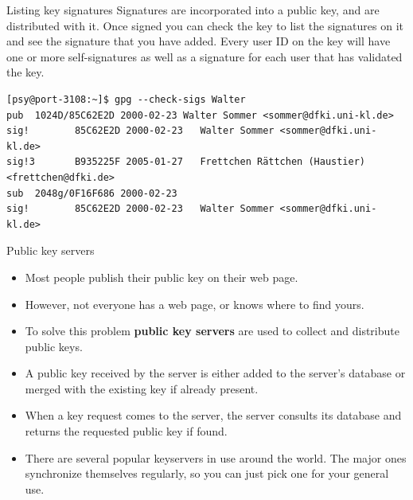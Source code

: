 \documentclass[%
mode=present,%
paper=smartboard,
size=20pt,
]{powerdot}
\begin{document}
\begin{slide}[method=direct]{Listing key signatures}
  Signatures are incorporated into a public key, and are distributed
  with it.  Once signed you can check the key to list the signatures
  on it and see the signature that you have added. Every user ID on
  the key will have one or more self-signatures as well as a signature
  for each user that has validated the key.\\[1ex]

\begin{verbatim}
[psy@port-3108:~]$ gpg --check-sigs Walter
pub  1024D/85C62E2D 2000-02-23 Walter Sommer <sommer@dfki.uni-kl.de>
sig!        85C62E2D 2000-02-23   Walter Sommer <sommer@dfki.uni-kl.de>
sig!3       B935225F 2005-01-27   Frettchen Rättchen (Haustier) <frettchen@dfki.de>
sub  2048g/0F16F686 2000-02-23
sig!        85C62E2D 2000-02-23   Walter Sommer <sommer@dfki.uni-kl.de>
\end{verbatim}%
\end{slide}

\begin{slide}{Public key servers}
  \begin{itemize}
  \item Most people publish their public key on their web page.
  \item However, not everyone has a web page, or knows where to find
    yours.
  \item To solve this problem \textbf{public key servers} are used to
    collect and distribute public keys.
  \item A public key received by the server is either added to the
    server's database or merged with the existing key if already
    present.
  \item When a key request comes to the server, the server consults
    its database and returns the requested public key if found.
  \item There are several popular keyservers in use around the world.
    The major ones synchronize themselves regularly, so you can just
    pick one for your general use.
  \end{itemize}
\end{slide}
\end{document}

